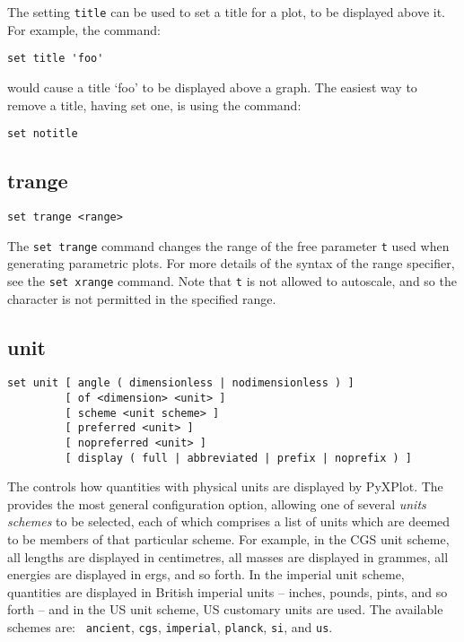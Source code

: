 The setting {\tt title} can be used to set a title for a plot, to be displayed
above it.  For example, the command:

\begin{verbatim}
set title 'foo'
\end{verbatim}

\noindent would cause a title `foo' to be displayed above a graph. The easiest
way to remove a title, having set one, is using the command:

\begin{verbatim}
set notitle
\end{verbatim}


\subsection{trange}

\begin{verbatim}
set trange <range>
\end{verbatim}

The {\tt set trange} command changes the range of the free parameter {\tt t}
used when generating parametric plots.  For more details of the syntax of the
range specifier, see the {\tt set xrange} command. Note that {\tt t} is not
allowed to autoscale, and so the {\tt *} character is not permitted in the
specified range.


\subsection{unit}

\begin{verbatim}
set unit [ angle ( dimensionless | nodimensionless ) ]
         [ of <dimension> <unit> ]
         [ scheme <unit scheme> ]
         [ preferred <unit> ]
         [ nopreferred <unit> ]
         [ display ( full | abbreviated | prefix | noprefix ) ]
\end{verbatim}

The  controls how quantities with physical units are
displayed by PyXPlot. The  provides the most general
configuration option, allowing one of several {\it units
schemes} to be selected, each of which comprises a
list of units which are deemed to be members of that particular scheme. For
example, in the CGS unit scheme, all lengths
are displayed in centimetres, all masses are displayed in grammes, all energies
are displayed in ergs, and so forth.  In the imperial unit
scheme, quantities are displayed in
British imperial units -- inches, pounds, pints, and so forth -- and in the US
unit scheme, US customary units are used. The available schemes are: {\tt
ancient}, {\tt cgs}, {\tt imperial}, {\tt planck}, {\tt si}, and {\tt us}.

